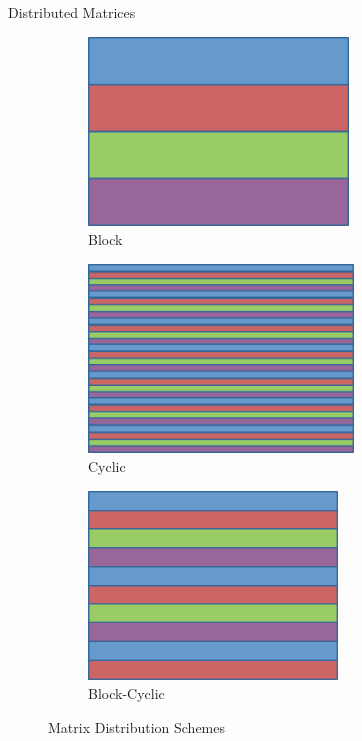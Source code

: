 \begin{frame}
\begin{block}{Distributed Matrices}
\begin{figure}[ht]
        \centering
        \begin{subfigure}[b]{0.3\textwidth}
                \centering
                
\includegraphics[height=5cm,width=\textwidth]{../common/pics/dmat_block}
                \caption{Block}
        \end{subfigure}
        \hspace{.1cm}
        \begin{subfigure}[b]{0.3\textwidth}
                \centering
                
\includegraphics[height=5cm,width=\textwidth]{../common/pics/dmat_cyclic}
                \caption{Cyclic}
        \end{subfigure}
        \hspace{.01cm}
        \begin{subfigure}[b]{0.3\textwidth}
                \centering
                
\includegraphics[height=5cm,width=\textwidth]{../common/pics/dmat_blockcyclic}
                \caption{Block-Cyclic}
        \end{subfigure}
        \caption{Matrix Distribution Schemes}\label{fig:dmat1d}
\end{figure}
\end{block}
\end{frame}




